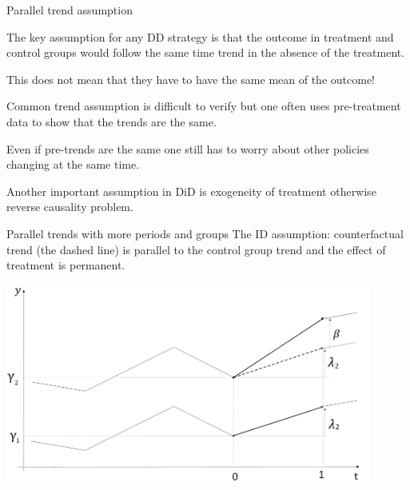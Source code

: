 \documentclass{beamer}
\begin{document}
\begin{frame}{Parallel trend assumption}
	
The key assumption for any DD strategy is that the outcome in treatment and control groups would follow the same time trend in the absence of the treatment.\bigskip

This does not mean that they have to have the same mean of the
outcome!\bigskip

Common trend assumption is difficult to verify but one often uses pre-treatment data to show that the trends are the same.\bigskip

Even if pre-trends are the same one still has to worry about other policies changing at the same time.\bigskip

Another important assumption in DiD is exogeneity of treatment otherwise reverse causality problem. 
\end{frame}


\begin{frame}{Parallel trends with more periods and groups}
The ID assumption: counterfactual trend (the dashed line) is parallel to the control group trend and the effect of treatment is permanent. 

\begin{center}
\includegraphics[width=0.9\textwidth]{./Figures/trends.png}
\end{center}
\end{frame}
\end{document}
